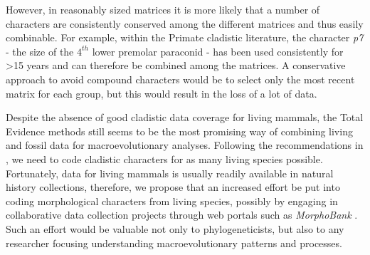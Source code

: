 However, in reasonably sized matrices \citep[\textgreater 100 characters;][]{GuillermeCooper,harrisonamong-character2014} it is more likely that a number of characters are consistently conserved among the different matrices and thus easily combinable.
For example, within the Primate cladistic literature, the character \textit{p7} - the size of the $4^{th}$ lower premolar paraconid - has been used consistently for \textgreater 15 years \citep[e.g.][]{ross1998phylogenetic,marivaux2005anthropoid,ni2013oldest} and can therefore be combined among the matrices.
A conservative approach to avoid compound characters would be to select only the most recent matrix for each group, but this would result in the loss of a lot of data.

Despite the absence of good cladistic data coverage for living mammals, the Total Evidence methods still seems to be the most promising way of combining living and fossil data for macroevolutionary analyses. 
Following the recommendations in \citep{GuillermeCooper}, we need to code cladistic characters for as many living species possible. 
Fortunately, data for living mammals is usually readily available in natural history collections, therefore, we propose that an increased effort be put into coding morphological characters from living species, possibly by engaging in collaborative data collection projects through web portals such as \textit{MorphoBank} \citep{morphobank}.
Such an effort would be valuable not only to phylogeneticists, but also to any researcher focusing understanding macroevolutionary patterns and processes.%


% 
% 

%


%
